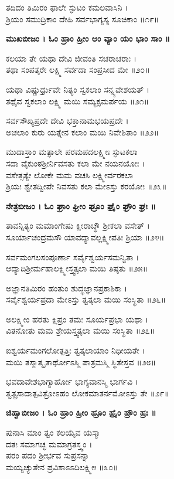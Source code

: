 ತದಿದಂ ತಿಮಿರಂ ಫಾಲೇ ಸ್ಫುಟಂ ಕಮಲವಾಸಿನಿ ।\\
ಶ್ರಿಯಂ ಸಮುದ್ರಿಕಾಂ ದೇಹಿ ಸರ್ವಭಾಗ್ಯಸ್ಯ ಸೂಚಿಕಾಂ ॥೧೯॥

{\bfseries ಮುಖಬೀಜಂ । ಓಂ ಹ್ರಾಂ ಹ್ರೀಂ ಆಂ ವ್ಯಾಂ ಯಂ ಭಾಂ ಸಾಂ ॥}

	ಕಲಯಾ ತೇ ಯಥಾ ದೇವಿ ಜೀವಂತಿ ಸಚರಾಚರಾಃ ।\\
	ತಥಾ ಸಂಪತ್ಕರೇ ಲಕ್ಷ್ಮಿ ಸರ್ವದಾ ಸಂಪ್ರಸೀದ ಮೇ ॥೨೦॥

ಯಥಾ ವಿಷ್ಣುರ್ಧ್ರುವೇ ನಿತ್ಯಂ ಸ್ವಕಲಾಂ ಸನ್ನ್ಯವೇಶಯತ್ ।\\
ತಥೈವ ಸ್ವಕಲಾಂ ಲಕ್ಷ್ಮಿ ಮಯಿ ಸಮ್ಯಕ್ಸಮರ್ಪಯ ॥೨೧॥

	ಸರ್ವಸೌಖ್ಯಪ್ರದೇ ದೇವಿ ಭಕ್ತಾನಾಮಭಯಪ್ರದೇ ।\\
	ಅಚಲಾಂ ಕುರು ಯತ್ನೇನ ಕಲಾಂ ಮಯಿ ನಿವೇಶಿತಾಂ ॥೨೨॥

ಮುದಾಸ್ತಾಂ ಮತ್ಫಾಲೇ ಪರಮಪದಲಕ್ಷ್ಮೀಃ ಸ್ಫುಟಕಲಾ\\
ಸದಾ ವೈಕುಂಠಶ್ರೀರ್ನಿವಸತು ಕಲಾ ಮೇ ನಯನಯೋಃ ।\\
	ವಸೇತ್ಸತ್ಯೇ ಲೋಕೇ ಮಮ ವಚಸಿ ಲಕ್ಷ್ಮೀರ್ವರಕಲಾ\\
	ಶ್ರಿಯಃ ಶ್ವೇತದ್ವೀಪೇ ನಿವಸತು ಕಲಾ ಮೇಽಸ್ತು ಕರಯೋಃ ॥೨೩॥

{\bfseries ನೇತ್ರಬೀಜಂ । ಓಂ ಘ್ರಾಂ ಘ್ರೀಂ ಘ್ರೂಂ ಘ್ರೈಂ ಘ್ರೌಂ ಘ್ರಃ ॥}

ತಾವನ್ನಿತ್ಯಂ ಮಮಾಂಗೇಷು ಕ್ಷೀರಾಬ್ಧೌ ಶ್ರೀಕಲಾ ವಸೇತ್ ।\\
ಸೂರ್ಯಾಚಂದ್ರಮಸೌ ಯಾವದ್ಯಾವಲ್ಲಕ್ಷ್ಮೀಪತಿಃ ಶ್ರಿಯಾ ॥೨೪॥

	ಸರ್ವಮಂಗಲಸಂಪೂರ್ಣಾ ಸರ್ವೈಶ್ವರ್ಯಸಮನ್ವಿತಾ ।\\
	ಆದ್ಯಾದಿಶ್ರೀರ್ಮಹಾಲಕ್ಷ್ಮೀಸ್ತ್ವತ್ಕಲಾ ಮಯಿ ತಿಷ್ಠತು ॥೨೫॥

ಅಜ್ಞಾನತಿಮಿರಂ ಹಂತುಂ ಶುದ್ಧಜ್ಞಾನಪ್ರಕಾಶಿಕಾ ।\\
ಸರ್ವೈಶ್ವರ್ಯಪ್ರದಾ ಮೇಽಸ್ತು ತ್ವತ್ಕಲಾ ಮಯಿ ಸಂಸ್ಥಿತಾ ॥೨೬॥

	ಅಲಕ್ಷ್ಮೀಂ ಹರತು ಕ್ಷಿಪ್ರಂ ತಮಃ ಸೂರ್ಯಪ್ರಭಾ ಯಥಾ ।\\
	ವಿತನೋತು ಮಮ ಶ್ರೇಯಸ್ತ್ವತ್ಕಲಾ ಮಯಿ ಸಂಸ್ಥಿತಾ ॥೨೭॥

ಐಶ್ವರ್ಯಮಂಗಲೋತ್ಪತ್ತಿಃ ತ್ವತ್ಕಲಾಯಾಂ ನಿಧೀಯತೇ ।\\
ಮಯಿ ತಸ್ಮಾತ್ಕೃತಾರ್ಥೋಽಸ್ಮಿ ಪಾತ್ರಮಸ್ಮಿ ಸ್ಥಿತೇಸ್ತವ ॥೨೮॥

	ಭವದಾವೇಶಭಾಗ್ಯಾರ್ಹೋ ಭಾಗ್ಯವಾನಸ್ಮಿ ಭಾರ್ಗವಿ ।\\
	ತ್ವತ್ಪ್ರಸಾದಾತ್ಪವಿತ್ರೋಽಹಂ ಲೋಕಮಾತರ್ನಮೋಽಸ್ತು ತೇ ॥೨೯॥

{\bfseries ಜಿಹ್ವಾಬೀಜಂ । ಓಂ ಹ್ರಾಂ ಹ್ರೀಂ ಹ್ರೂಂ ಹ್ರೈಂ ಹ್ರೌಂ ಹ್ರಃ ॥}

ಪುನಾಸಿ ಮಾಂ ತ್ವಂ ಕಲಯೈವ ಯಸ್ಮಾ\\ದತಃ ಸಮಾಗಚ್ಛ ಮಮಾಗ್ರತಸ್ತ್ವಂ ।\\
ಪರಂ ಪದಂ ಶ್ರೀರ್ಭವ ಸುಪ್ರಸನ್ನಾ \\ಮಯ್ಯಚ್ಯುತೇನ ಪ್ರವಿಶಾಽಽದಿಲಕ್ಷ್ಮೀಃ ॥೩೦॥


